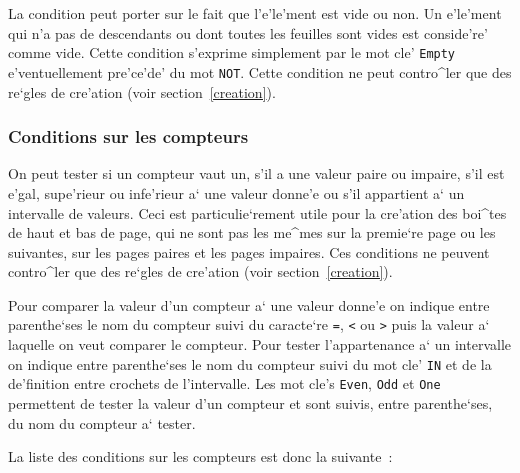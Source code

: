 {La condition peut porter sur le fait que l'e'le'ment est vide ou non.
Un e'le'ment qui n'a pas de descendants ou dont toutes les feuilles
sont vides est conside're' comme vide.
Cette condition s'exprime simplement par le mot cle' {\tt Empty}
e'ventuellement pre'ce'de' du mot {\tt NOT}.
Cette condition ne peut contro^ler que des re`gles de cre'ation
(voir section~\ref{creation}).

\subsubsection{Conditions sur les compteurs}

On peut tester si un compteur vaut un, s'il a une valeur
paire ou impaire, s'il est e'gal, supe'rieur ou infe'rieur a` une
valeur donne'e ou s'il appartient a` un intervalle de valeurs. Ceci
est particulie`rement utile pour la cre'ation des boi^tes 
de haut et bas de page, qui ne sont pas les me^mes sur la premie`re page
ou les suivantes, sur les pages paires et les pages impaires.
Ces conditions ne peuvent contro^ler que des re`gles de cre'ation
(voir section~\ref{creation}).

Pour comparer la valeur d'un compteur a` une
valeur donne'e on indique entre
parenthe`ses le nom du compteur suivi du caracte`re {\tt =},
{\tt <} ou {\tt >} puis la valeur a` laquelle on veut comparer le
compteur.
Pour tester l'appartenance a` un intervalle on indique entre
parenthe`ses le nom du compteur suivi du mot cle' {\tt IN} et de la
de'finition entre crochets de l'intervalle.
Les mot cle's {\tt Even}, {\tt Odd} et {\tt One}
permettent de tester la valeur d'un compteur et sont suivis, entre
parenthe`ses, du nom du compteur a` tester.

La liste des conditions sur les compteurs est donc la suivante~:

}
